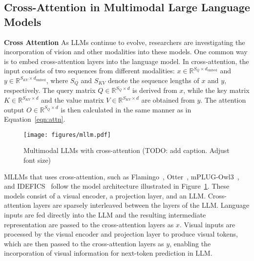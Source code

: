 \subsection{Cross-Attention in Multimodal Large Language Models}
\textbf{Cross Attention} As LLMs continue to evolve, researchers are investigating the incorporation of vision and other modalities into these models. One common way is to embed cross-attention layers into the language model. In cross-attention, the input consists of two sequences from different modalities: $x \in \mathbb{R}^{S_Q \times d_{\text{embed}}}$ and $y \in \mathbb{R}^{S_{KV} \times d_{\text{embed}}}$, where $S_Q$ and $S_{KV}$ denote the sequence lengths of $x$ and $y$, respectively. The query matrix $Q \in \mathbb{R}^{S_Q \times d}$ is derived from $x$, while the key matrix $K \in \mathbb{R}^{S_{KV} \times d}$ and the value matrix $V \in \mathbb{R}^{S_{KV} \times d}$ are obtained from $y$. The attention output $O \in \mathbb{R}^{S_Q \times d}$ is then calculated in the same manner as in Equation~\ref{eqn:attn}.
\begin{figure}[t]
    \centering
    \texttt{[image: figures/mllm.pdf]}
    \caption{Multimodal LLMs with cross-attention (TODO: add caption. Adjust font size)}
    \label{fig:mllm-architecture}
\end{figure}
MLLMs that uses cross-attention, such as Flamingo~\cite{alayrac2022flamingo}, Otter~\cite{li2023otter}, mPLUG-Owl3~\cite{ye2024mplugowl3}, and IDEFICS~\cite{laurencon2023idefics} follow the model architecture illustrated in Figure~\ref{fig:mllm-architecture}. These models consist of a visual encoder, a projection layer, and an LLM. Cross-attention layers are sparsely interleaved between the layers of the LLM. Language inputs are fed directly into the LLM and the resulting intermediate representation are passed to the cross-attention layers as $x$. Visual inputs are processed by the visual encoder and projection layer to produce visual tokens, which are then passed to the cross-attention layers as $y$, enabling the incorporation of visual information for next-token prediction in LLM.

